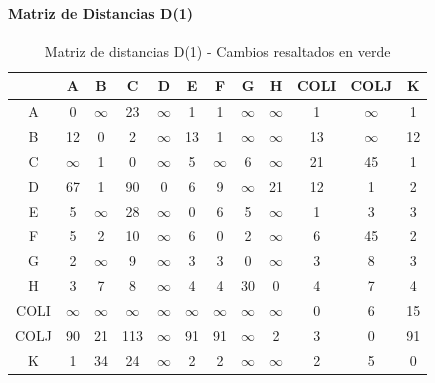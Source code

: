 \documentclass[12pt]{article}
\begin{document}
\paragraph{Matriz de Distancias D(1)}
\begin{table}[h!]
\centering
\begin{tabular}{|c|c|c|c|c|c|c|c|c|c|c|c|}
\hline
 & A & B & C & D & E & F & G & H & COLI & COLJ & K \\\hline
A & 0 & $\infty$ & 23 & $\infty$ & 1 & 1 & $\infty$ & $\infty$ & 1 & $\infty$ & 1 \\\hline
B & 12 & 0 & 2 & $\infty$ & \cellcolor{lightgreen} 13 & 1 & $\infty$ & $\infty$ & \cellcolor{lightgreen} 13 & $\infty$ & 12 \\\hline
C & $\infty$ & 1 & 0 & $\infty$ & 5 & $\infty$ & 6 & $\infty$ & 21 & 45 & 1 \\\hline
D & 67 & 1 & \cellcolor{lightgreen} 90 & 0 & 6 & 9 & $\infty$ & 21 & 12 & 1 & 2 \\\hline
E & 5 & $\infty$ & \cellcolor{lightgreen} 28 & $\infty$ & 0 & \cellcolor{lightgreen} 6 & 5 & $\infty$ & 1 & 3 & 3 \\\hline
F & 5 & 2 & 10 & $\infty$ & \cellcolor{lightgreen} 6 & 0 & 2 & $\infty$ & \cellcolor{lightgreen} 6 & 45 & 2 \\\hline
G & 2 & $\infty$ & 9 & $\infty$ & \cellcolor{lightgreen} 3 & \cellcolor{lightgreen} 3 & 0 & $\infty$ & \cellcolor{lightgreen} 3 & 8 & \cellcolor{lightgreen} 3 \\\hline
H & 3 & 7 & 8 & $\infty$ & \cellcolor{lightgreen} 4 & \cellcolor{lightgreen} 4 & 30 & 0 & \cellcolor{lightgreen} 4 & 7 & \cellcolor{lightgreen} 4 \\\hline
COLI & $\infty$ & $\infty$ & $\infty$ & $\infty$ & $\infty$ & $\infty$ & $\infty$ & $\infty$ & 0 & 6 & 15 \\\hline
COLJ & 90 & 21 & \cellcolor{lightgreen} 113 & $\infty$ & \cellcolor{lightgreen} 91 & \cellcolor{lightgreen} 91 & $\infty$ & 2 & 3 & 0 & \cellcolor{lightgreen} 91 \\\hline
K & 1 & 34 & \cellcolor{lightgreen} 24 & $\infty$ & \cellcolor{lightgreen} 2 & \cellcolor{lightgreen} 2 & $\infty$ & $\infty$ & \cellcolor{lightgreen} 2 & 5 & 0 \\\hline
\end{tabular}
\caption{Matriz de distancias D(1) - Cambios resaltados en verde}
\end{table}
\end{document}

